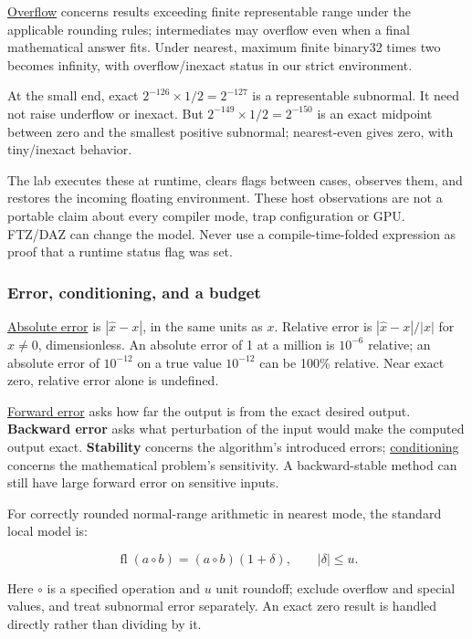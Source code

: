 \hyperref[appendix-ed8531b46754]{Overflow} concerns results exceeding finite representable range under the applicable rounding rules; intermediates may overflow even when a final mathematical answer fits. Under nearest, maximum finite binary32 times two becomes infinity, with overflow/inexact status in our strict environment.

At the small end, exact \(2^{-126}\times1/2=2^{-127}\) is a representable subnormal. It need not raise underflow or inexact. But \(2^{-149}\times1/2=2^{-150}\) is an exact midpoint between zero and the smallest positive subnormal; nearest-even gives zero, with tiny/inexact behavior.

The lab executes these at runtime, clears flags between cases, observes them, and restores the incoming floating environment. These host observations are not a portable claim about every compiler mode, trap configuration or GPU. FTZ/DAZ can change the model. Never use a compile-time-folded expression as proof that a runtime status flag was set.

\subsubsection{Error, conditioning, and a budget}\label{05-engine-i-ch001-error-conditioning-and-a-budget}

\hyperref[appendix-3ae74e89b4e6]{Absolute error} is \(|\widehat x-x|\), in the same units as \(x\). Relative error is \(|\widehat x-x|/|x|\) for \(x\ne0\), dimensionless. An absolute error of 1 at a million is \(10^{-6}\) relative; an absolute error of \(10^{-12}\) on a true value \(10^{-12}\) can be 100\% relative. Near exact zero, relative error alone is undefined.

\hyperref[appendix-a7fbaf6d1b1c]{Forward error} asks how far the output is from the exact desired output. \textbf{Backward error} asks what perturbation of the input would make the computed output exact. \textbf{Stability} concerns the algorithm's introduced errors; \hyperref[appendix-8f6a01f284a7]{conditioning} concerns the mathematical problem's sensitivity. A backward-stable method can still have large forward error on sensitive inputs.

For correctly rounded normal-range arithmetic in nearest mode, the standard local model is:

\[
\operatorname{fl}(a\circ b)=(a\circ b)(1+\delta),\qquad |\delta|\le u.
\]

Here \(\circ\) is a specified operation and \(u\) unit roundoff; exclude overflow and special values, and treat subnormal error separately. An exact zero result is handled directly rather than dividing by it.

